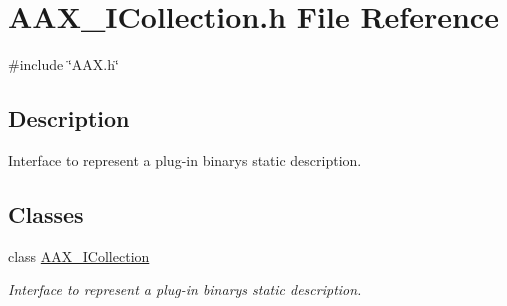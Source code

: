 \hypertarget{a00566}{}\section{A\+A\+X\+\_\+\+I\+Collection.\+h File Reference}
\label{a00566}
{\ttfamily \#include \char`\"{}A\+A\+X.\+h\char`\"{}}\newline


\subsection{Description}
Interface to represent a plug-\/in binary\textquotesingle{}s static description. 

\subsection*{Classes}
\begin{DoxyCompactItemize}
\item 
class \mbox{\hyperlink{a01777}{A\+A\+X\+\_\+\+I\+Collection}}
\begin{DoxyCompactList}\small\item\em Interface to represent a plug-\/in binary\textquotesingle{}s static description. \end{DoxyCompactList}\end{DoxyCompactItemize}

